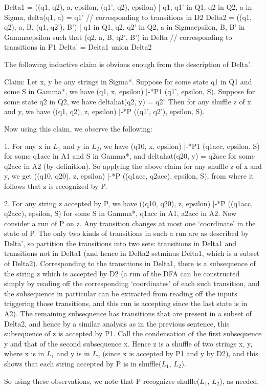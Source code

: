 \documentclass[answers]{exam}
\begin{document}
\begin{questions}
\begin{solution}
Delta1 = {((q1, q2), a, epsilon, (q1', q2), epsilon) | q1, q1' in Q1, q2 in Q2, a in Sigma, delta(q1, a) = q1'} // corresponding to transitions in D2
Delta2 = {((q1, q2), a, B, (q1, q2'), B') | q1 in Q1, q2, q2' in Q2, a in Sigmaepsilon, B, B' in Gammaepsilon such that (q2, a, B, q2', B') in Delta} // corresponding to transitions in P1
Delta' = Delta1 union Delta2

The following inductive claim is obvious enough from the description of Delta'.

Claim: Let x, y be any strings in Sigma*. Suppose for some state q1 in Q1 and some S in Gamma*, we have (q1, x, epsilon) |-*P1 (q1', epsilon, S). Suppose for some state q2 in Q2, we have deltahat(q2, y) = q2'. Then for any shuffle z of x and y, we have ((q1, q2), z, epsilon) |-*P ((q1', q2'), epsilon, S).

Now using this claim, we observe the following:

1. For any x in $L_1$ and y in $L_2$, we have (q10, x, epsilon) |-*P1 (q1acc, epsilon, S) for some q1acc in A1 and S in Gamma*, and deltahat(q20, y) = q2acc for some q2acc in A2 (by definition). So
applying the above claim for any shuffle z of x and y, we get ((q10, q20), z, epsilon) |-*P ((q1acc, q2acc), epsilon, S), from where it follows that z is recognized by P.

2. For any string z accepted by P, we have ((q10, q20), z, epsilon) |-*P ((q1acc, q2acc), epsilon, S) for some S in Gamma*, q1acc in A1, a2acc in A2. Now consider a run of P on z. Any transition changes at most one `coordinate' in the state of P. The only two kinds of transitions in such a run are as described by Delta', so partition the transitions into two sets: transitions in Delta1 and transitions not in Delta1 (and hence in Delta2 setminus Delta1, which is a subset of Delta2). Corresponding to the transitions in Delta1, there is a subsequence of the string z which is accepted by D2 (a run of the DFA can be constructed simply by reading off the corresponding `coordinates' of each such transition, and the subsequence in particular can be extracted from reading off the inputs triggering those transitions, and this run is accepting since the last state is in A2). The remaining subsequence has transitions that are present in a subset of Delta2, and hence by a similar analysis as in the previous sentence, this subsequence of z is accepted by P1. Call the condensation of the first subsequence y and that of the second subsequence x. Hence z is a shuffle of two strings x, y, where x is in $L_1$ and y is in $L_2$ (since x is accepted by P1 and y by D2), and this shows that each string accepted by P is in shuffle($L_1$, $L_2$).

So using these observations, we note that P recognizes shuffle($L_1$, $L_2$), as needed.

    
\end{solution}

\end{questions}
\end{document}
